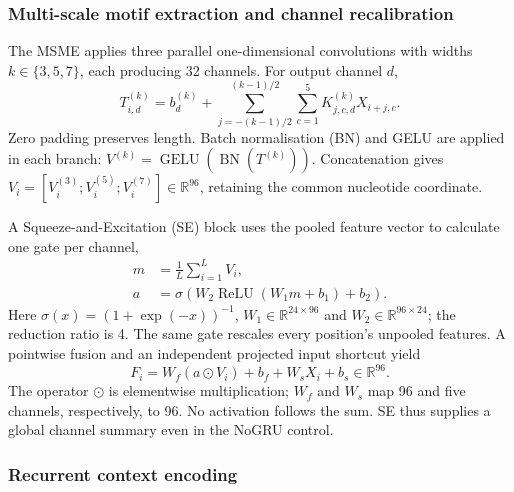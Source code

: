 \subsubsection{Multi-scale motif extraction and channel recalibration}\label{subsec:blocks}

The MSME applies three parallel one-dimensional convolutions with widths $k\in\{3,5,7\}$, each producing 32 channels. For output channel $d$,
\begin{equation}
T^{(k)}_{i,d}=b^{(k)}_d+
\sum_{j=-(k-1)/2}^{(k-1)/2}\sum_{c=1}^{5}
K^{(k)}_{j,c,d}X_{i+j,c}.
\label{eq:multiscale_convolution}
\end{equation}
Zero padding preserves length. Batch normalisation (BN) and GELU are applied in each branch:
$V^{(k)}=\operatorname{GELU}(\operatorname{BN}(T^{(k)}))$.
Concatenation gives $V_i=[V_i^{(3)};V_i^{(5)};V_i^{(7)}]\in\mathbb R^{96}$, retaining the common nucleotide coordinate.

A Squeeze-and-Excitation (SE) block \citep{hu2018senet} uses the pooled feature vector to calculate one gate per channel,
\begin{equation}
\begin{aligned}
m&=\frac1L\sum_{i=1}^{L}V_i,\\
a&=\sigma\!\left(W_2\operatorname{ReLU}(W_1m+b_1)+b_2\right).
\end{aligned}
\label{eq:se_gate}
\end{equation}
Here $\sigma(x)=(1+\exp(-x))^{-1}$, $W_1\in\mathbb R^{24\times96}$ and $W_2\in\mathbb R^{96\times24}$; the reduction ratio is 4. The same gate rescales every position's unpooled features. A pointwise fusion and an independent projected input shortcut \citep{he2016resnet} yield
\begin{equation}
F_i=W_f(a\odot V_i)+b_f+W_sX_i+b_s
\in\mathbb R^{96}.
\label{eq:motif_residual}
\end{equation}
The operator $\odot$ is elementwise multiplication; $W_f$ and $W_s$ map 96 and five channels, respectively, to 96. No activation follows the sum. SE thus supplies a global channel summary even in the NoGRU control.

\subsubsection{Recurrent context encoding}


